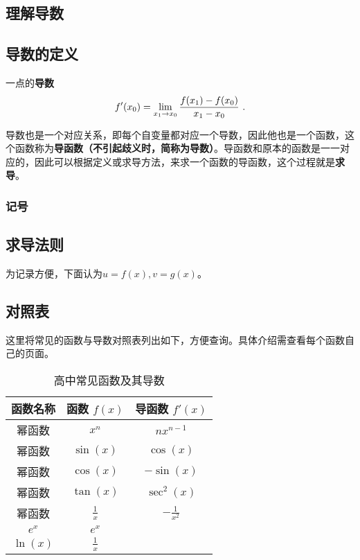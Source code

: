
\begin{issues}
\issueDraft
\end{issues}

\subsection{理解导数}

\subsection{导数的定义}
一点的\textbf{导数}
\begin{equation}
f'(x_0)=\lim_{x_1\to x_0}{f(x_1)-f(x_0)\over x_1-x_0}~.
\end{equation}

导数也是一个对应关系，即每个自变量都对应一个导数，因此他也是一个函数，这个函数称为\textbf{导函数（不引起歧义时，简称为导数）}。导函数和原本的函数是一一对应的，因此可以根据定义或求导方法，来求一个函数的导函数，这个过程就是\textbf{求导}。

\subsubsection{记号}


\subsection{求导法则}

为记录方便，下面认为$u=f(x),v=g(x)$。

\subsection{对照表}

这里将常见的函数与导数对照表列出如下，方便查询。具体介绍需查看每个函数自己的页面。

\begin{table}[ht]
\centering
\caption{高中常见函数及其导数}\label{tab_HsDerv1}
\begin{tabular}{|c|c|c|}
\hline
\textbf{函数名称}     & \textbf{函数 $f(x)$}     & \textbf{导函数 $f'(x)$}     \\ \hline
幂函数&$x^n$                    & $n x^{n-1}$                \\ \hline
幂函数&$\sin(x)$                 & $\cos(x)$                  \\ \hline
幂函数&$\cos(x)$                 & $-\sin(x)$                 \\ \hline
幂函数&$\tan(x)$                 & $\sec^2(x)$                \\ \hline
幂函数&$\frac{1}{x}$             & $-\frac{1}{x^2}$           \\ \hline
$e^x$                     & $e^x$                      \\ \hline
$\ln(x)$                  & $\frac{1}{x}$              \\ \hline
\end{tabular}
\end{table}

